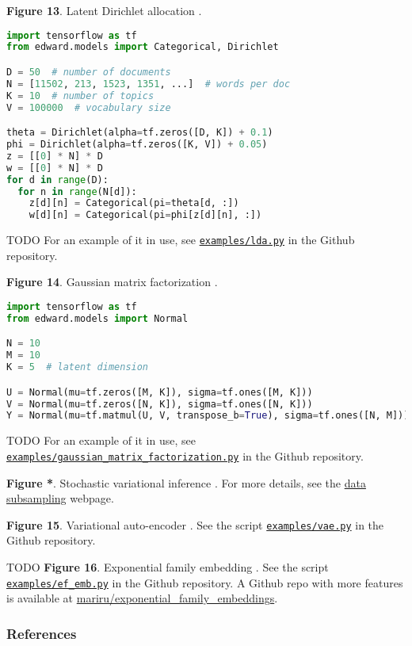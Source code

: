 \textbf{Figure 13}. Latent Dirichlet allocation \citep{blei2003latent}.
\begin{lstlisting}[language=python]
import tensorflow as tf
from edward.models import Categorical, Dirichlet

D = 50  # number of documents
N = [11502, 213, 1523, 1351, ...]  # words per doc
K = 10  # number of topics
V = 100000  # vocabulary size

theta = Dirichlet(alpha=tf.zeros([D, K]) + 0.1)
phi = Dirichlet(alpha=tf.zeros([K, V]) + 0.05)
z = [[0] * N] * D
w = [[0] * N] * D
for d in range(D):
  for n in range(N[d]):
    z[d][n] = Categorical(pi=theta[d, :])
    w[d][n] = Categorical(pi=phi[z[d][n], :])
\end{lstlisting}
TODO
For an example of it in use, see
\href{https://github.com/blei-lab/edward/blob/master/examples/lda.py}{\texttt{examples/lda.py}}
in the Github repository.

\textbf{Figure 14}. Gaussian matrix factorization
\citep{salakhutdinov2011probabilistic}.
\begin{lstlisting}[language=python]
import tensorflow as tf
from edward.models import Normal

N = 10
M = 10
K = 5  # latent dimension

U = Normal(mu=tf.zeros([M, K]), sigma=tf.ones([M, K]))
V = Normal(mu=tf.zeros([N, K]), sigma=tf.ones([N, K]))
Y = Normal(mu=tf.matmul(U, V, transpose_b=True), sigma=tf.ones([N, M]))
\end{lstlisting}
TODO
For an example of it in use, see
\href{https://github.com/blei-lab/edward/blob/master/examples/gaussian_matrix_factorization.py}{\texttt{examples/gaussian_matrix_factorization.py}}
in the Github repository.

\textbf{Figure *}. Stochastic variational inference \citep{hoffman2013stochastic}.
For more details, see the
\href{/api/data-subsampling}{data subsampling} webpage.

\textbf{Figure 15}. Variational auto-encoder
\citep{kingma2014auto,rezende2014stochastic}.
See the script
\href{https://github.com/blei-lab/edward/blob/master/examples/vae.py}{\texttt{examples/vae.py}}
in the Github repository.

TODO
\textbf{Figure 16}. Exponential family embedding \citep{rudolph2016exponential}.
See the script
\href{https://github.com/blei-lab/edward/blob/master/examples/ef_emb.py}{\texttt{examples/ef_emb.py}}
in the Github repository.
A Github repo with more features is available at
\href{https://github.com/mariru/exponential_family_embeddings}{mariru/exponential_family_embeddings}.

\subsubsection{References}\label{references}
